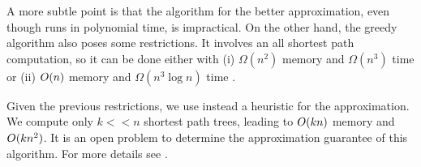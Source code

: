 A more subtle point is that the algorithm for the better approximation, even though runs in polynomial time, is impractical.
On the other hand, the greedy algorithm also poses some restrictions.
It involves an all shortest path computation, so it can be done either with (i) $\Omega(n^2)$ memory and $\Omega(n^3)$ time or (ii) $O(n)$ memory and $\Omega(n^3\log n)$ time . 

Given the previous restrictions, we use instead a heuristic for the approximation.
We compute only $k<<n$ shortest path trees, leading to $O(kn)$ memory and $O(kn^2)$.
It is an open problem to determine the approximation guarantee of this algorithm.
For more details see .
